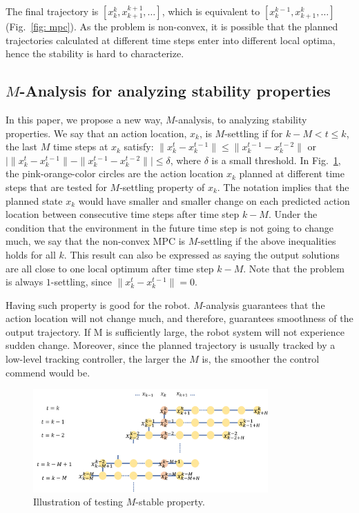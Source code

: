 \documentclass[letterpaper, 10 pt, conference]{ieeeconf}  %
\begin{document}
The final trajectory is $[x_k^k,x_{k+1}^{k+1},\ldots]$, which is equivalent to $[x_{k}^{k-1},x_{k+1}^{k},\ldots]$ (Fig.~\ref{fig: mpc}). As the problem is non-convex, it is possible that the planned trajectories calculated at different time steps enter into different local optima, hence the stability is hard to characterize. 

\subsection{$M$-Analysis for analyzing stability properties}
In this paper, we propose a new way, $M$-analysis, to analyzing stability properties.
We say that an action location, $x_{k}$, is $M$-settling if for $k-M< t\leq k$, the last $M$ time steps at $x_{k}$ satisfy: $\|x_{k}^t-x_k^{t-1}\|\leq \|x_k^{t-1}-x_k^{t-2}\|$ or $\bigl|\|x_{k}^t-x_k^{t-1}\|-\|x_k^{t-1}-x_k^{t-2}\|\bigr|\leq \delta$, where $\delta$ is a small threshold. In Fig.~\ref{fig:m-stable}, the pink-orange-color circles are the action location $x_{k}$ planned at different time steps that are  tested for $M$-settling property of $x_{k}$. The notation implies that the planned state $x_k$ would have smaller and smaller change on each predicted action location between consecutive time steps after time step $k-M$. Under the condition that the environment in the future time step is not going to change much, we say that the non-convex MPC is $M$-settling if the above inequalities holds for all $k$. This result can also be expressed as saying the output solutions are all close to one local optimum after time step $k-M$. Note that the problem is always $1$-settling, since $\|x_{k}^t-x_k^{t-1}\|=0$.

Having such property is good for the robot. $M$-analysis guarantees that the action location will not change much, and therefore, guarantees smoothness of the output trajectory. If M is sufficiently large, the robot system will not experience sudden change. Moreover, since the planned trajectory is usually tracked by a low-level tracking controller, the larger the $M$ is, the smoother the control commend would be.

\begin{figure}[t]
\begin{center}
\includegraphics[width=9cm]{src/Mstable.png}
\caption{Illustration of testing $M$-stable property.}
\label{fig:m-stable}
\end{center}
\end{figure}
\end{document}
